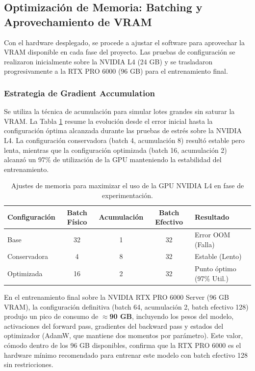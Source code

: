 \subsection{Optimización de Memoria: Batching y Aprovechamiento de VRAM}
Con el hardware desplegado, se procede a ajustar el software para aprovechar la VRAM disponible en cada fase del proyecto. Las pruebas de configuración se realizaron inicialmente sobre la NVIDIA L4 (24 GB) y se trasladaron progresivamente a la RTX PRO 6000 (96 GB) para el entrenamiento final.

\subsubsection{Estrategia de Gradient Accumulation}
Se utiliza la técnica de acumulación para simular lotes grandes sin saturar la VRAM. La Tabla \ref{tab:training_configs} resume la evolución desde el error inicial hasta la configuración óptima alcanzada durante las pruebas de estrés sobre la NVIDIA L4. La configuración conservadora (batch 4, acumulación 8) resultó estable pero lenta, mientras que la configuración optimizada (batch 16, acumulación 2) alcanzó un 97\% de utilización de la GPU manteniendo la estabilidad del entrenamiento.

\begin{table}[H]
    \centering
    \begin{tabularx}{\textwidth}{|l|c|c|c|X|}
        \hline
        \textbf{Configuración} & \textbf{Batch Físico} & \textbf{Acumulación} & \textbf{Batch Efectivo} & \textbf{Resultado} \\ \hline
        Base                   & 32                    & 1                    & 32                      & Error OOM (Falla)  \\ \hline
        Conservadora           & 4                     & 8                    & 32                      & Estable (Lento)    \\ \hline
        Optimizada             & 16                    & 2                    & 32                      & Punto óptimo (97\% Util.) \\ \hline
    \end{tabularx}
    \caption{Ajustes de memoria para maximizar el uso de la GPU NVIDIA L4 en fase de experimentación.}
    \label{tab:training_configs}
\end{table}

En el entrenamiento final sobre la NVIDIA RTX PRO 6000 Server (96 GB VRAM), la configuración definitiva (batch 64, acumulación 2, batch efectivo 128) produjo un pico de consumo de \textbf{$\approx$90 GB}, incluyendo los pesos del modelo, activaciones del forward pass, gradientes del backward pass y estados del optimizador (AdamW, que mantiene dos momentos por parámetro). Este valor, cómodo dentro de los 96 GB disponibles, confirma que la RTX PRO 6000 es el hardware mínimo recomendado para entrenar este modelo con batch efectivo 128 sin restricciones.

